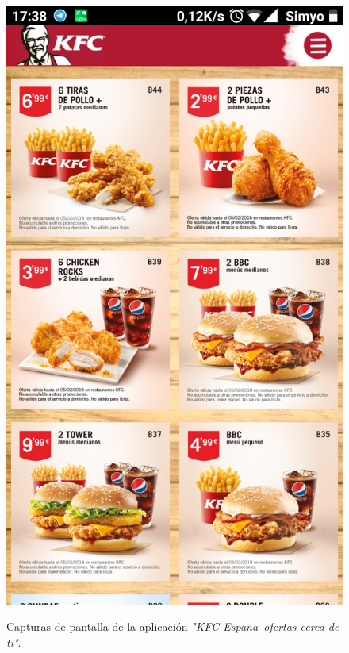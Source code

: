 \documentclass[twoside]{report}
\begin{document}
\begin{figure}[H]
\begin{center}
\includegraphics[scale=0.10]{images/restaurantes/kfc1.png}
\caption{Capturas de pantalla de la aplicación \textit{"KFC España–ofertas cerca de ti"}.} \cite{kfcapp}
\end{center}
\end{figure}
\end{document}
